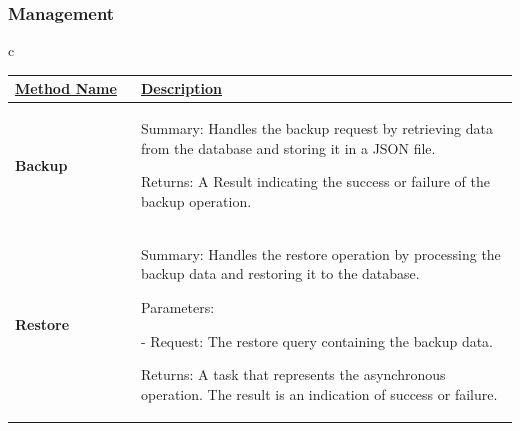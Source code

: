 \newpage
\subsubsection{Management}
\begin{longtable}{c}
    \renewcommand{\arraystretch}{1.2}
    \begin{tabular}{|p{0.25\linewidth}|p{0.75\linewidth}|}
\hline
    \underline{Method Name} & \underline{Description} 
\\
\hline
    \textbf{Backup} & Summary: Handles the backup request by retrieving data from the database and storing it in a JSON file.
    
Returns: A Result indicating the success or failure of the backup operation.
\\
\hline
    \textbf{Restore} & Summary: Handles the restore operation by processing the backup data and restoring it to the database.
    
Parameters:

- Request: The restore query containing the backup data.

Returns: A task that represents the asynchronous operation. The result is an indication of success or failure.
\\
        \hline
    \end{tabular}
\end{longtable}    
